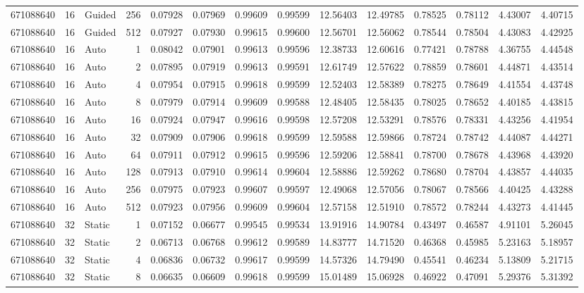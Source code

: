 \begin{tabular}{rrlrrrrrrrrrrr}
671088640 & 16 & Guided & 256 & 0.07928 & 0.07969 & 0.99609 & 0.99599 & 12.56403 & 12.49785 & 0.78525 & 0.78112 & 4.43007 & 4.40715 \\
671088640 & 16 & Guided & 512 & 0.07927 & 0.07930 & 0.99615 & 0.99600 & 12.56701 & 12.56062 & 0.78544 & 0.78504 & 4.43083 & 4.42925 \\
671088640 & 16 & Auto & 1 & 0.08042 & 0.07901 & 0.99613 & 0.99596 & 12.38733 & 12.60616 & 0.77421 & 0.78788 & 4.36755 & 4.44548 \\
671088640 & 16 & Auto & 2 & 0.07895 & 0.07919 & 0.99613 & 0.99591 & 12.61749 & 12.57622 & 0.78859 & 0.78601 & 4.44871 & 4.43514 \\
671088640 & 16 & Auto & 4 & 0.07954 & 0.07915 & 0.99618 & 0.99599 & 12.52403 & 12.58389 & 0.78275 & 0.78649 & 4.41554 & 4.43748 \\
671088640 & 16 & Auto & 8 & 0.07979 & 0.07914 & 0.99609 & 0.99588 & 12.48405 & 12.58435 & 0.78025 & 0.78652 & 4.40185 & 4.43815 \\
671088640 & 16 & Auto & 16 & 0.07924 & 0.07947 & 0.99616 & 0.99598 & 12.57208 & 12.53291 & 0.78576 & 0.78331 & 4.43256 & 4.41954 \\
671088640 & 16 & Auto & 32 & 0.07909 & 0.07906 & 0.99618 & 0.99599 & 12.59588 & 12.59866 & 0.78724 & 0.78742 & 4.44087 & 4.44271 \\
671088640 & 16 & Auto & 64 & 0.07911 & 0.07912 & 0.99615 & 0.99596 & 12.59206 & 12.58841 & 0.78700 & 0.78678 & 4.43968 & 4.43920 \\
671088640 & 16 & Auto & 128 & 0.07913 & 0.07910 & 0.99614 & 0.99604 & 12.58886 & 12.59262 & 0.78680 & 0.78704 & 4.43857 & 4.44035 \\
671088640 & 16 & Auto & 256 & 0.07975 & 0.07923 & 0.99607 & 0.99597 & 12.49068 & 12.57056 & 0.78067 & 0.78566 & 4.40425 & 4.43288 \\
671088640 & 16 & Auto & 512 & 0.07923 & 0.07956 & 0.99609 & 0.99604 & 12.57158 & 12.51910 & 0.78572 & 0.78244 & 4.43273 & 4.41445 \\
671088640 & 32 & Static & 1 & 0.07152 & 0.06677 & 0.99545 & 0.99534 & 13.91916 & 14.90784 & 0.43497 & 0.46587 & 4.91101 & 5.26045 \\
671088640 & 32 & Static & 2 & 0.06713 & 0.06768 & 0.99612 & 0.99589 & 14.83777 & 14.71520 & 0.46368 & 0.45985 & 5.23163 & 5.18957 \\
671088640 & 32 & Static & 4 & 0.06836 & 0.06732 & 0.99617 & 0.99599 & 14.57326 & 14.79490 & 0.45541 & 0.46234 & 5.13809 & 5.21715 \\
671088640 & 32 & Static & 8 & 0.06635 & 0.06609 & 0.99618 & 0.99599 & 15.01489 & 15.06928 & 0.46922 & 0.47091 & 5.29376 & 5.31392 \\

\end{tabular}
